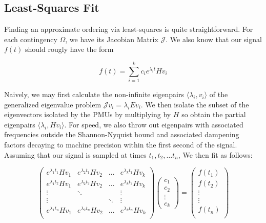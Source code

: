 \begin{appendices}
\chapter{Least-Squares Fit}\label{LSfit}
Finding an approximate ordering via least-squares is quite straightforward. For each contingency $\Omega$, we have its Jacobian Matrix $\mathcal{J}$. We also know that our signal $f(t)$ should rougly have the form

$$f(t) = \sum_{i = 1}^{k} c_i e^{\lambda_it}Hv_i$$

Naively, we may first calculate the non-infinite eigenpairs $ \langle \lambda_i, v_i \rangle$ of the generalized eigenvalue problem $\mathcal{J}v_i = \lambda_i E v_i$. We then isolate the subset of the eigenvectors isolated by the PMUs by multiplying by $H$ so obtain the partial eigenpairs  $ \langle \lambda_i, Hv_i \rangle$. For speed, we also throw out eigenpairs with associated frequencies outside the Shannon-Nyquist bound and associated dampening factors decaying to machine precision within the first second of the signal. Assuming that our signal is sampled at times $t_1, t_2, \dots t_n$, We then fit as follows: 

\begin{equation}
\begin{pmatrix}
    e^{\lambda_1 t_1}Hv_1 & e^{\lambda_2 t_1}Hv_2 & \dots & e^{\lambda_k t_1}Hv_k \\
    e^{\lambda_1 t_2}Hv_1 & e^{\lambda_2 t_2}Hv_2 & \dots & e^{\lambda_k t_2}Hv_k \\
    \vdots & \ddots &  & \vdots \\
    \vdots &  & \ddots & \vdots \\
    e^{\lambda_1 t_n}Hv_1 & e^{\lambda_2 t_n}Hv_2 & \dots & e^{\lambda_k t_n}Hv_k \\
\end{pmatrix}
\begin{pmatrix}
    c_1 \\
    c_2 \\
    \vdots \\
    c_k
\end{pmatrix} = 
\begin{pmatrix}
    f(t_1) \\
    f(t_2) \\
    \vdots \\
    \vdots \\
    f(t_n) \\
\end{pmatrix}
\end{equation}
\end{appendices}

